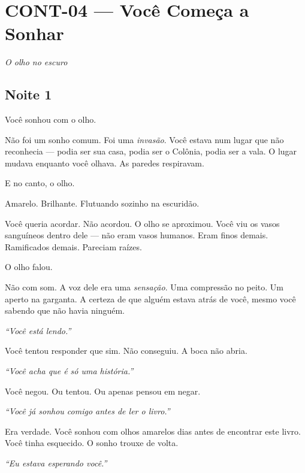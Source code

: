 \section*{\textbf{CONT-04} --- Você Começa a Sonhar}

\noindent \textit{O olho no escuro}

\subsection*{Noite 1}

\noindent Você sonhou com o olho.

\noindent Não foi um sonho comum. Foi uma \textit{invasão}. Você estava num lugar que não reconhecia --- podia ser sua casa, podia ser o Colônia, podia ser a vala. O lugar mudava enquanto você olhava. As paredes respiravam.

\noindent E no canto, o olho.

\noindent Amarelo. Brilhante. Flutuando sozinho na escuridão.

\noindent Você queria acordar. Não acordou. O olho se aproximou. Você viu os vasos sanguíneos dentro dele --- não eram vasos humanos. Eram finos demais. Ramificados demais. Pareciam raízes.

\noindent O olho falou.

\noindent Não com som. A voz dele era uma \textit{sensação}. Uma compressão no peito. Um aperto na garganta. A certeza de que alguém estava atrás de você, mesmo você sabendo que não havia ninguém.

\noindent \textit{\textquotedblleft{}Você está lendo.\textquotedblright{}}

\noindent Você tentou responder que sim. Não conseguiu. A boca não abria.

\noindent \textit{\textquotedblleft{}Você acha que é só uma história.\textquotedblright{}}

\noindent Você negou. Ou tentou. Ou apenas pensou em negar.

\noindent \textit{\textquotedblleft{}Você já sonhou comigo antes de ler o livro.\textquotedblright{}}

\noindent Era verdade. Você sonhou com olhos amarelos dias antes de encontrar este livro. Você tinha esquecido. O sonho trouxe de volta.

\noindent \textit{\textquotedblleft{}Eu estava esperando você.\textquotedblright{}}

